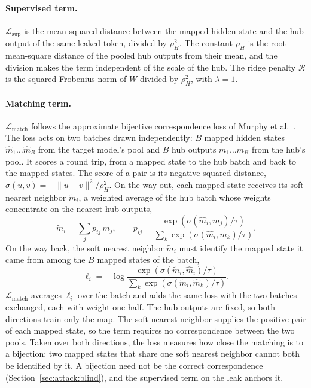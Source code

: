 \paragraph{Supervised term.} $\mathcal{L}_{\text{sup}}$ is the mean squared distance between the mapped hidden state and the hub output of the same leaked token, divided by $\rho_H^2$.
The constant $\rho_H$ is the root-mean-square distance of the pooled hub outputs from their mean, and the division makes the term independent of the scale of the hub.
The ridge penalty $\mathcal{R}$ is the squared Frobenius norm of $W$ divided by $\rho_H^2$, with $\lambda = 1$.

\paragraph{Matching term.} $\mathcal{L}_{\text{match}}$ follows the approximate bijective correspondence loss of Murphy et al.~\cite{murphy2022abc}.
The loss acts on two batches drawn independently: $B$ mapped hidden states $\hat m_1 \ldots \hat m_B$ from the target model's pool and $B$ hub outputs $m_1 \ldots m_B$ from the hub's pool.
It scores a round trip, from a mapped state to the hub batch and back to the mapped states.
The score of a pair is its negative squared distance, $\sigma(u, v) = -\lVert u - v\rVert^2 / \rho_H^2$.
On the way out, each mapped state receives its soft nearest neighbor $\tilde m_i$, a weighted average of the hub batch whose weights concentrate on the nearest hub outputs,
\begin{equation}
\tilde m_i = \sum_{j} p_{ij}\, m_j ,
\qquad
p_{ij} = \frac{\exp(\sigma(\hat m_i, m_j)/\tau)}{\sum_{k}\exp(\sigma(\hat m_i, m_k)/\tau)} .
\label{eq:attack:match}
\end{equation}
On the way back, the soft nearest neighbor $\tilde m_i$ must identify the mapped state it came from among the $B$ mapped states of the batch,
\begin{equation}
\ell_i = -\log\frac{\exp(\sigma(\tilde m_i, \hat m_i)/\tau)}{\sum_{k}\exp(\sigma(\tilde m_i, \hat m_k)/\tau)} .
\label{eq:attack:return}
\end{equation}
$\mathcal{L}_{\text{match}}$ averages $\ell_i$ over the batch and adds the same loss with the two batches exchanged, each with weight one half.
The hub outputs are fixed, so both directions train only the map.
The soft nearest neighbor supplies the positive pair of each mapped state, so the term requires no correspondence between the two pools.
Taken over both directions, the loss measures how close the matching is to a bijection: two mapped states that share one soft nearest neighbor cannot both be identified by it.
A bijection need not be the correct correspondence (Section~\ref{sec:attack:blind}), and the supervised term on the leak anchors it.

